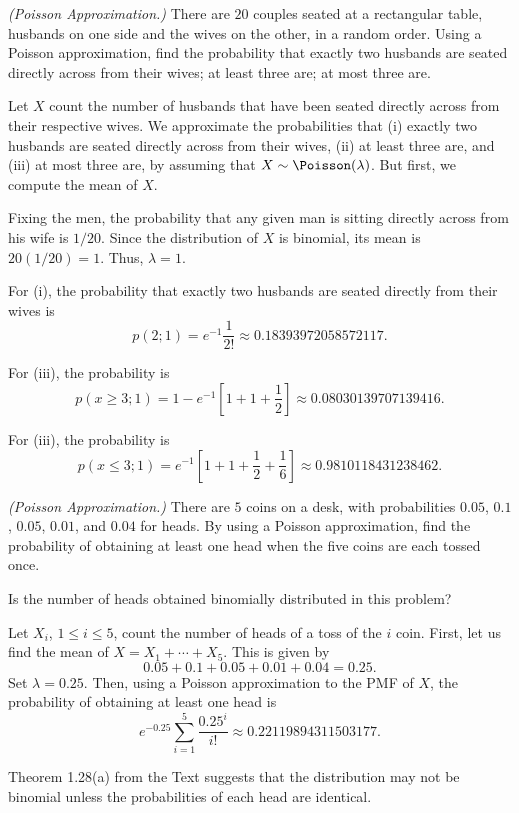 \begin{problem}[Handout 10, \# 6]
  \emph{(Poisson Approximation.)} There are \(20\) couples seated at a
  rectangular table, husbands on one side and the wives on the other, in a
  random order. Using a Poisson approximation, find the probability that
  exactly two husbands are seated directly across from their wives; at
  least three are; at most three are.
\end{problem}
\begin{solution}
  Let \(X\) count the number of husbands that have been seated directly
  across from their respective wives. We approximate the probabilities that
  (i) exactly two husbands are seated directly across from their wives,
  (ii) at least three are, and (iii) at most three are, by assuming that
  \(X\sim\Poisson(\lambda)\). But first, we compute the mean of \(X\).

  Fixing the men, the probability that any given man is sitting directly
  across from his wife is \(1/20\). Since the distribution of \(X\) is
  binomial, its mean is \(20(1/20)=1\). Thus, \(\lambda=1\).

  For (i), the probability that exactly two husbands are seated directly
  from their wives is
  \[
    p(2;1)=e^{-1}\frac{1}{2!}\approx\num{0.18393972058572117}.
  \]

  For (iii), the probability is
  \[
    p(x\geq
    3;1)=1-e^{-1}\left[1+1+\frac{1}{2}\right]\approx\num{0.08030139707139416}.
  \]

  For (iii), the probability is
  \[
    p(x\leq 3;1)=
    e^{-1}\left[1+1+\frac{1}{2}+\frac{1}{6}\right]\approx\num{0.9810118431238462}.
  \]
\end{solution}
\newpage

\begin{problem}[Handout 10, \# 7]
  \emph{(Poisson Approximation.)} There are \(5\) coins on a desk, with
  probabilities \(0.05\), \(0.1\), \(0.05\), \(0.01\), and \(0.04\) for
  heads. By using a Poisson approximation, find the probability of
  obtaining at least one head when the five coins are each tossed once.

  \noindent Is the number of heads obtained binomially distributed in this
  problem?
\end{problem}
\begin{solution}
  Let \(X_i\), \(1\leq i\leq 5\), count the number of heads of a toss of
  the \(i\) coin. First, let us find the mean of
  \(X=X_1+\dotsb+X_5\). This is given by
  \[
   0.05+0.1+0.05+0.01+0.04=0.25.
  \]
  Set \(\lambda=0.25\). Then, using a Poisson approximation to the PMF of
  \(X\), the probability of obtaining at least one head is
  \[
    e^{-0.25}\sum_{i=1}^5 \frac{0.25^i}{i!}\approx\num{0.22119894311503177}.
  \]

  Theorem 1.28(a) from the Text suggests that the distribution may not be
  binomial unless the probabilities of each head are identical.
\end{solution}
\newpage

